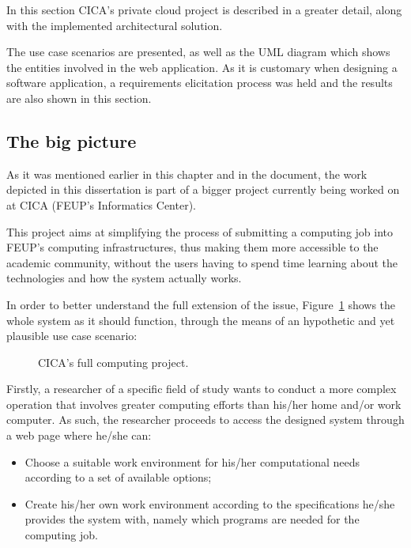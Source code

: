 In this section CICA's private cloud project is described in a greater detail, along with the implemented architectural solution.

The use case scenarios are presented, as well as the UML diagram which shows the entities involved in the web application. As it is customary when designing a software application, a requirements elicitation process was held and the results are also shown in this section.

\subsection{The big picture}\label{subsec:bigpicture}

As it was mentioned earlier in this chapter and in the document, the work depicted in this dissertation is part of a bigger project currently being worked on at CICA (FEUP's Informatics Center).

This project aims at simplifying the process of submitting a computing job into FEUP's computing infrastructures, thus making them more accessible to the academic community, without the users having to spend time learning about the technologies and how the system actually works.

In order to better understand the full extension of the issue, Figure~\ref{fig:big_picture} shows the whole system as it should function, through the means of an hypothetic and yet plausible use case scenario:

\begin{figure}[h!]
  \begin{center}
    \leavevmode
    \caption{CICA's full computing project.}
    \label{fig:big_picture}
  \end{center}
\end{figure}

Firstly, a researcher of a specific field of study wants to conduct a more complex operation that involves greater computing efforts than his/her home and/or work computer. As such, the researcher proceeds to access the designed system through a web page where he/she can:

\begin{itemize}
	\item Choose a suitable work environment for his/her computational needs according to a set of available options;
	\item Create his/her own work environment according to the specifications he/she provides the system with, namely which programs are needed for the computing job.
\end{itemize}

